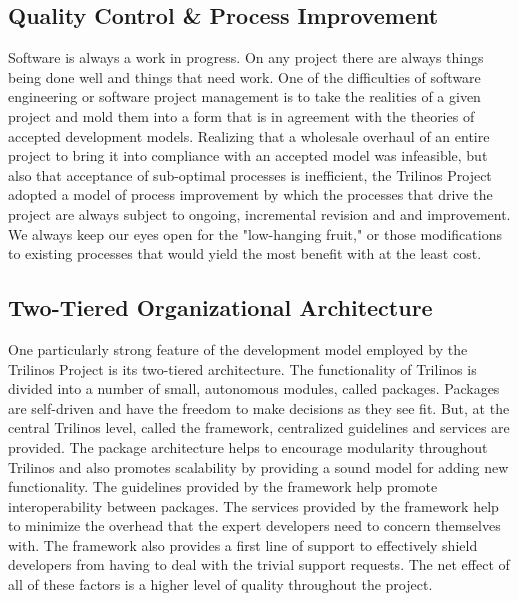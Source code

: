 \documentclass[12pt,relax]{article}
\begin{document}
\subsection{Quality Control \& Process Improvement}

Software is always a work in progress.  On any project there are always things
being done well and things that need work.  One of the difficulties of 
software engineering or software project management is to take the realities
of a given project and mold them into a form that is in agreement with the
theories of accepted development models.  Realizing that a wholesale overhaul
of an entire project to bring it into compliance with an accepted model was 
infeasible, but also that acceptance of sub-optimal processes is inefficient, 
the Trilinos Project adopted a model of process improvement by which the 
processes that drive the project are always subject to ongoing, incremental 
revision and and improvement.  We always keep our eyes open for the 
"low-hanging fruit," or those modifications to existing processes that would 
yield the most benefit with at the least cost.  

\subsection{Two-Tiered Organizational Architecture}

One particularly strong feature of the development model employed by the
Trilinos Project is its two-tiered architecture.  The functionality of Trilinos
is divided into a number of small, autonomous modules, called packages. 
Packages are self-driven and have the freedom to make decisions as they see
fit.  But, at the central Trilinos level, called the framework, centralized
guidelines and services are provided.  The package architecture helps to
encourage modularity throughout Trilinos and also promotes scalability by
providing a sound model for adding new functionality.  The guidelines provided
by the framework help promote interoperability between packages.  The services
provided by the framework help to minimize the overhead that the expert
developers need to concern themselves with.  The framework also provides a
first line of support to effectively shield developers from having to deal
with the trivial support requests.  The net effect of all of these factors is
a higher level of quality throughout the project.
\end{document}

